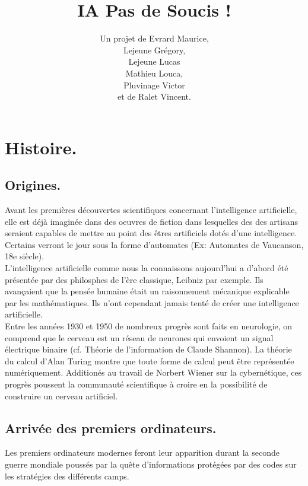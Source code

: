 \documentclass[a4paper, 12pt]{article}
\title{IA Pas de Soucis !}
\author{Un projet de Evrard Maurice,\\ Lejeune Grégory,\\ Lejeune Lucas \\ Mathieu Louca,\\ Pluvinage Victor\\ et de Ralet Vincent.}
\numberwithin{equation}{subsection}
\begin{document}
\maketitle
\newpage
\tableofcontents
\newpage
\section{Histoire.}
\subsection{Origines.}
Avant les premières découvertes scientifiques concernant l'intelligence artificielle, elle est déjà imaginée dans des oeuvres de fiction dans lesquelles des des artisans seraient capables de mettre au point des êtres artificiels dotés d'une intelligence. Certains verront le jour sous la forme d'automates (Ex: Automates de Vaucanson, 18e siècle).\\

L'intelligence artificielle comme nous la connaissons aujourd'hui a d'abord été présentée par des philosphes de l'ère classique, Leibniz par exemple. Ils avançaient que la pensée humaine était un raisonnement mécanique explicable par les mathématiques. Ils n'ont cependant jamais tenté de créer une intelligence artificielle.\\

Entre les années 1930 et 1950 de nombreux progrès sont faits en neurologie, on comprend que le cerveau est un réseau de neurones qui envoient un signal électrique binaire (cf. Théorie de l'information de Claude Shannon). La théorie du calcul d'Alan Turing montre que toute forme de calcul peut être représentée numériquement. Additionés au travail de Norbert Wiener sur la cybernétique, ces progrès poussent la communauté scientifique à croire en la possibilité de construire un cerveau artificiel.
\subsection{Arrivée des premiers ordinateurs.}
Les premiers ordinateurs modernes feront leur apparition durant la seconde guerre mondiale poussés par la quête d'informations protégées par des codes sur les stratégies des différents camps.
\end{document}
